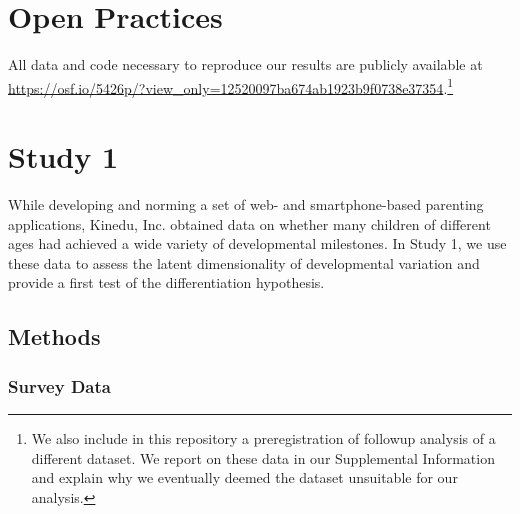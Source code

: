 \documentclass[man, floatsintext]{apa7}
\begin{document}
\section{Open Practices}

All data and code necessary to reproduce our results are publicly available at \url{https://osf.io/5426p/?view_only=12520097ba674ab1923b9f0738e37354}.\footnote{We also include in this repository a preregistration of followup analysis of a different dataset. We report on these data in our Supplemental Information and explain why we eventually deemed the dataset unsuitable for our analysis.}

%
\section{Study 1}


While developing and norming a set of web- and smartphone-based
parenting applications, Kinedu, Inc. obtained data on whether many
children of different ages had achieved a wide variety of developmental milestones. In Study 1, we use these data to assess the latent dimensionality of developmental variation and provide a first test of the differentiation hypothesis.

\subsection{Methods}

\subsubsection{Survey Data}
\end{document}
